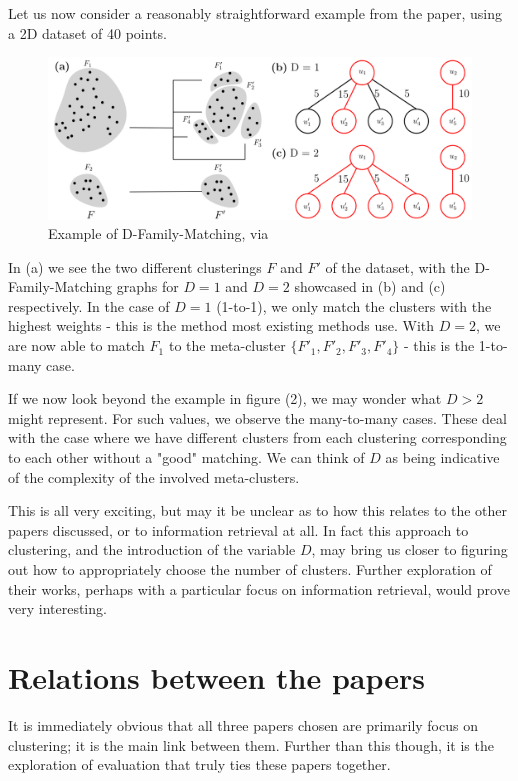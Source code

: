 \documentclass[sigconf,authorversion,nonacm]{acmart}
\begin{document}
Let us now consider a reasonably straightforward example from the paper, using a 2D dataset of 40 points.
\begin{figure}[H]
  \centering
  \includegraphics[width=\linewidth]{dfamilymatching.png}
  \caption{Example of D-Family-Matching, via \cite{Cazals2019}}
\end{figure}
In (a) we see the two different clusterings $F$ and $F'$ of the dataset, with the D-Family-Matching graphs for $D=1$ and $D=2$ showcased in (b) and (c) respectively. In the case of $D=1$ (1-to-1), we only match the clusters with the highest weights - this is the method most existing methods use. With $D=2$, we are now able to match $F_1$ to the meta-cluster $\{F'_1, F'_2, F'_3, F'_4\}$ - this is the 1-to-many case.

If we now look beyond the example in figure (2), we may wonder what $D>2$ might represent. For such values, we observe the many-to-many cases. These deal with the case where we have different clusters from each clustering corresponding to each other without a "good" matching. We can think of $D$ as being indicative of the complexity of the involved meta-clusters.

This is all very exciting, but may it be unclear as to how this relates to the other papers discussed, or to information retrieval at all. In fact this approach to clustering, and the introduction of the variable $D$, may bring us closer to figuring out how to appropriately choose the number of clusters. Further exploration of their works, perhaps with a particular focus on information retrieval, would prove very interesting.
\section{Relations between the papers}
It is immediately obvious that all three papers chosen are primarily focus on clustering; it is the main link between them. Further than this though, it is the exploration of evaluation that truly ties these papers together.
\end{document}
